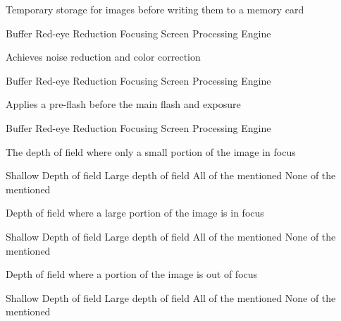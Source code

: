 \documentclass[theme=sleek, randomorder, hidesidemenu]{webquiz}
\begin{document}
\begin{question}
  Temporary storage for images before writing them to a memory card
  \begin{choice}[columns=2]
    \correct Buffer
    \incorrect Red-eye Reduction
    \incorrect Focusing Screen
    \incorrect Processing Engine
  \end{choice}
\end{question}

\begin{question}
  Achieves noise reduction and color correction
  \begin{choice}[columns=2]
    \incorrect Buffer
    \incorrect Red-eye Reduction
    \incorrect Focusing Screen
    \correct Processing Engine
  \end{choice}
\end{question}

\begin{question}
  Applies a pre-flash before the main flash and exposure
  \begin{choice}[columns=2]
    \incorrect Buffer
    \correct Red-eye Reduction
    \incorrect Focusing Screen
    \incorrect Processing Engine
  \end{choice}
\end{question}

\begin{question}
  The depth of field where only a small portion of the image in focus
  \begin{choice}[columns=2]
    \correct Shallow Depth of field
    \incorrect Large depth of field
    \incorrect All of the mentioned
    \incorrect None of the mentioned
  \end{choice}
\end{question}

\begin{question}
  Depth of field where a large portion of the image is in focus
  \begin{choice}[columns=2]
    \correct Shallow Depth of field
    \incorrect Large depth of field
    \incorrect All of the mentioned
    \incorrect None of the mentioned
  \end{choice}
\end{question}

\begin{question}
  Depth of field where a portion of the image is out of focus
  \begin{choice}[columns=2]
    \incorrect Shallow Depth of field
    \incorrect Large depth of field
    \correct All of the mentioned
    \incorrect None of the mentioned
  \end{choice}
\end{question}
\end{document}
